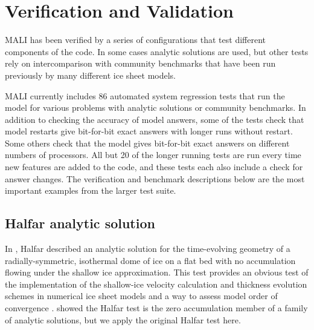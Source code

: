\chapter{Verification and Validation}
\label{chap:landice-vv}


MALI has been verified by a series of configurations that test different components of the code.
In some cases analytic solutions are used, but other tests rely on intercomparison with community benchmarks
that have been run previously by many different ice sheet models.

MALI currently includes 86 automated system regression tests that run the model for various
problems with analytic solutions or community benchmarks.
In addition to checking the accuracy of model answers,
some of the tests check that model restarts give bit-for-bit 
exact answers with longer runs without restart.
Some others check that the model gives bit-for-bit 
exact answers on different numbers of processors.
All but 20 of the longer running tests are run every time new features are added to the code,
and these tests each also include a check for answer changes.
The verification and benchmark descriptions below are the most 
important examples from the larger test suite.

\section{Halfar analytic solution}
In \citep{Halfar1981,Halfar1983}, Halfar
described an analytic solution for the time-evolving geometry of a radially-symmetric, isothermal dome of ice 
on a flat bed with no accumulation flowing under the shallow ice approximation.
This test provides an obvious test of the implementation of the shallow-ice velocity calculation and thickness evolution schemes
in numerical ice sheet models and a way to assess model order of convergence \citep{bueler2005,egholm2010}.
\citet{bueler2005} showed the Halfar test is the zero accumulation member of a family of analytic solutions,
but we apply the original Halfar test here.

